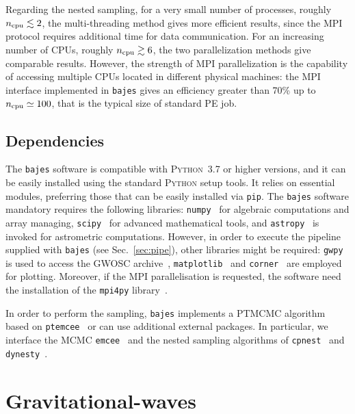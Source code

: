 \documentclass[prd,aps,twocolumn,a4paper,showkeys,nofootinbib,floatfix]{revtex4-1}
\newcommand{\bajes}{{\tt bajes}}
\newcommand{\py}{\textsc{Python}}
\begin{document}
 Regarding the nested sampling,
 for a very small number of processes, roughly $n_{\rm cpu} \lesssim 2$, the multi-threading 
 method gives more efficient results, since the MPI protocol requires additional time for 
data communication.
 For an increasing number of CPUs, roughly $n_{\rm cpu} \gtrsim 6$,
 the 
 two parallelization methods give comparable results.
 However, the strength of MPI parallelization is the capability of accessing multiple 
 CPUs located in different physical machines:
 the MPI interface implemented in {\bajes} 
 gives an efficiency greater than 70\% up to $n_{\rm cpu} \simeq 100$, 
 that is the typical size of standard PE job.

\subsection{Dependencies} 
\label{sec:depend}

The {\bajes} software is compatible with {\py}~3.7 or higher versions,
and it can be easily installed 
using the standard {\py} setup tools.
It relies on essential modules, preferring 
those that can be easily installed via {\tt pip}.
The {\bajes} software mandatory requires the following libraries:
{\tt numpy}~\cite{NumPy:2020} for algebraic computations and array managing,
{\tt scipy}~\cite{SciPy:2020} for advanced mathematical tools,
and {\tt astropy}~\cite{Price-Whelan:2018hus} is invoked for astrometric computations.
However, in order to execute the pipeline supplied with {\bajes} (see Sec.~\ref{sec:pipe}), 
other libraries might be required:
{\tt gwpy}~\cite{GWpy,2019ascl.soft12016M} 
is used to access the GWOSC archive~\cite{Abbott:2019ebz,Trovato:2019liz,gwosc},
{\tt matplotlib}~\cite{MPL} and {\tt corner}~\cite{corner} are employed
for plotting.
Moreover, if the MPI parallelisation is requested, the software need the
installation of the {\tt mpi4py} library~\cite{mpi4py1,mpi4py2,mpi4py3}.

In order to perform the sampling, {\bajes} implements a PTMCMC
algorithm based on {\tt ptemcee}~\cite{Vousden_2015} or can use
additional external packages. In particular, we interface
the MCMC {\tt emcee}~\cite{Foreman_Mackey_2013} and the nested
sampling algorithms of {\tt cpnest}~\cite{cpnest} and {\tt dynesty}~\cite{Speagle_2020}.


\section{Gravitational-waves} 
\label{sec:gw}
\end{document}
